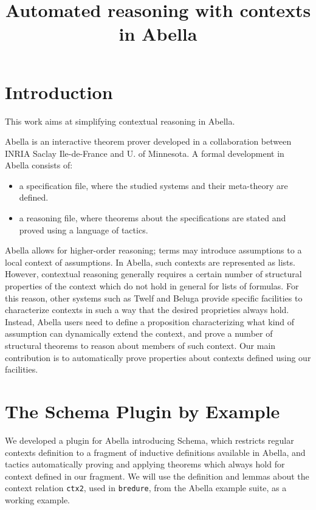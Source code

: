 \documentclass[nocopyrightspace,authoryear]{sigplanconf}
\title{Automated reasoning with contexts in Abella}
\begin{document}
\maketitle
\section{Introduction}
This work aims at simplifying contextual reasoning in Abella.

Abella \cite{abellasys} is an interactive theorem prover developed in a collaboration between INRIA Saclay Ile-de-France and U. of Minnesota. A formal development in Abella consists of:
\begin{itemize}
\item a specification file, where the studied systems and their meta-theory are defined.
\item a reasoning file, where theorems about the specifications are stated and proved using a language of tactics.
\end{itemize}

Abella allows for higher-order reasoning; terms may introduce assumptions to a local context of assumptions. In Abella, such contexts are represented as lists. However, contextual reasoning generally requires a certain number of structural properties of the context which do not hold in general for lists of formulas. For this reason, other systems such as Twelf \cite{twelfsys} and Beluga \cite{belugasys} provide specific facilities to characterize contexts in such a way that the desired proprieties always hold. Instead, Abella users need to define a proposition characterizing what kind of assumption can dynamically extend the context, and prove a number of structural theorems to reason about members of such context. Our main contribution is to automatically prove properties about contexts defined using our facilities.

\section{The Schema Plugin by Example}

We developed a plugin for Abella introducing Schema, which restricts regular contexts definition to a fragment of inductive definitions available in Abella, and tactics automatically proving and applying theorems which always hold for context defined in our fragment. We will use the definition and lemmas about the context relation \lstinline|ctx2|, used in \lstinline|bredure|, from the Abella example suite, as a working example.
\end{document}
